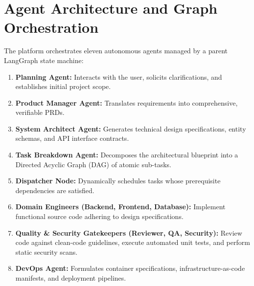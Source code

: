 \section{Agent Architecture and Graph Orchestration}
The platform orchestrates eleven autonomous agents managed by a parent LangGraph state machine:
\begin{enumerate}
    \item \textbf{Planning Agent:} Interacts with the user, solicits clarifications, and establishes initial project scope.
    \item \textbf{Product Manager Agent:} Translates requirements into comprehensive, verifiable PRDs.
    \item \textbf{System Architect Agent:} Generates technical design specifications, entity schemas, and API interface contracts.
    \item \textbf{Task Breakdown Agent:} Decomposes the architectural blueprint into a Directed Acyclic Graph (DAG) of atomic sub-tasks.
    \item \textbf{Dispatcher Node:} Dynamically schedules tasks whose prerequisite dependencies are satisfied.
    \item \textbf{Domain Engineers (Backend, Frontend, Database):} Implement functional source code adhering to design specifications.
    \item \textbf{Quality \& Security Gatekeepers (Reviewer, QA, Security):} Review code against clean-code guidelines, execute automated unit tests, and perform static security scans.
    \item \textbf{DevOps Agent:} Formulates container specifications, infrastructure-as-code manifests, and deployment pipelines.
\end{enumerate}
